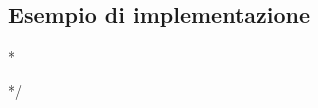 \documentclass[12pt]{article}
\newenvironment{changemargin}[2]{%
    \begin{list}{}{%
    \setlength{\topsep}{0pt}%
    \setlength{\leftmargin}{#1}%
    \setlength{\rightmargin}{#2}%
    \setlength{\listparindent}{\parindent}%
    \setlength{\itemindent}{\parindent}%
    \setlength{\parsep}{\parskip}%
    }%
    \item[]}{\end{list}}
\begin{document}
    \subsection{Esempio di implementazione}

\/*
    \begin{changemargin}{-1cm}{-1cm}

    
    \end{changemargin}
*/    
  
   
    \vfill
    \let\thefootnote\relax{}
\end{document}
